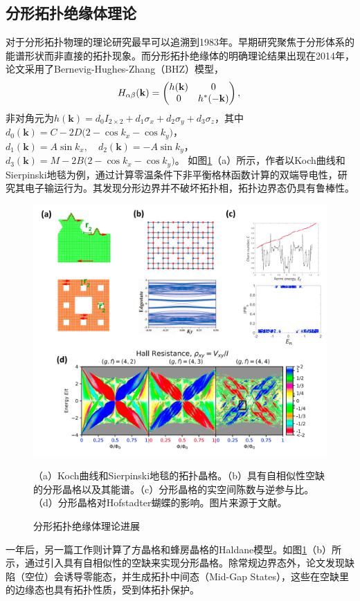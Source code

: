 \subsection{分形拓扑绝缘体理论}
对于分形拓扑物理的理论研究最早可以追溯到1983年。早期研究聚焦于分形体系的能谱形状而非直接的拓扑现象\cite{alexander1984some,banavar1985energy}。而分形拓扑绝缘体的明确理论结果出现在2014年\cite{song2014topological}，论文采用了Bernevig-Hughes-Zhang（BHZ）模型，
\begin{equation}
    H_{\alpha \beta}(\mathbf{k}) = 
    \begin{pmatrix}
    h(\mathbf{k}) & 0 \\
    0 & h^*(-\mathbf{k})
    \end{pmatrix}, \\
\end{equation}
非对角元为$h(\mathbf{k}) = d_0 I_{2 \times 2} + d_1 \sigma_x + d_2 \sigma_y + d_3 \sigma_z$，其中$d_0(\mathbf{k}) = C - 2D \big( 2 - \cos k_x - \cos k_y \big)$，$d_1(\mathbf{k}) = A \sin k_x, \quad d_2(\mathbf{k}) = -A \sin k_y$，$d_3(\mathbf{k}) = M - 2B \big( 2 - \cos k_x - \cos k_y \big)$。
如图\ref{fig:TopoFractal}（a）所示，作者以Koch曲线和Sierpinski地毯为例，通过计算零温条件下非平衡格林函数计算的双端导电性，研究其电子输运行为。其发现分形边界并不破坏拓扑相，拓扑边界态仍具有鲁棒性。
\begin{figure}[htbp]
    \centering
    \includegraphics[width=0.6\linewidth]{figure/FractalTopo/TopoFractal.jpg}
    \caption{分形拓扑绝缘体理论进展}（a）Koch曲线和Sierpinski地毯的拓扑晶格。（b）具有自相似性空缺的分形晶格以及其能谱。（c）分形晶格的实空间陈数与逆参与比。（d）分形晶格对Hofstadter蝴蝶的影响。图片来源于文献\cite{song2014topological,he2015topological,pai2019topological,fremling2020existence}。
    \label{fig:TopoFractal}
\end{figure}
一年后，另一篇工作则计算了方晶格和蜂房晶格的Haldane模型\cite{he2015topological}。如图\ref{fig:TopoFractal}（b）所示，通过引入具有自相似性的空缺来实现分形晶格。除常规边界态外，论文发现缺陷（空位）会诱导零能态，并生成拓扑中间态（Mid-Gap States），这些在空缺里的边缘态也具有拓扑性质，受到体拓扑保护。


